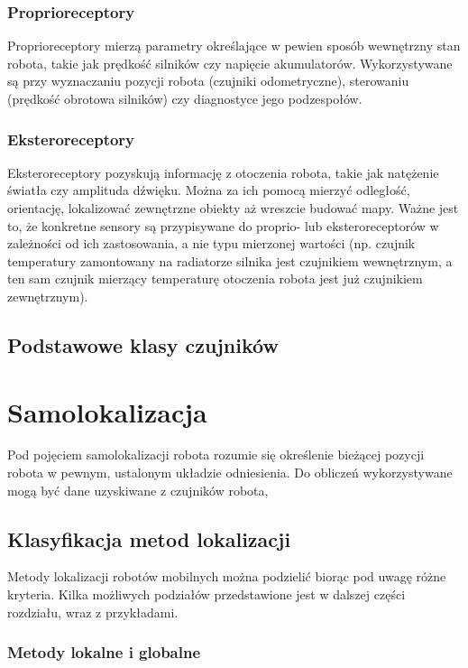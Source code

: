 \subsubsection{Proprioreceptory}

Proprioreceptory mierzą parametry określające w pewien sposób wewnętrzny stan
robota, takie jak prędkość silników czy napięcie akumulatorów. Wykorzystywane są
przy wyznaczaniu pozycji robota (czujniki odometryczne), sterowaniu (prędkość
obrotowa silników) czy diagnostyce jego podzespołów.

\subsubsection{Eksteroreceptory}

Eksteroreceptory pozyskują informację z otoczenia robota, takie jak natężenie
światła czy amplituda dźwięku. Można za ich pomocą mierzyć odległość,
orientację, lokalizować zewnętrzne obiekty aż wreszcie budować mapy.
Ważne jest to, że konkretne sensory są przypisywane do proprio- lub
eksteroreceptorów w zależności od ich zastosowania, a nie typu mierzonej
wartości (np. czujnik temperatury zamontowany na radiatorze silnika jest
czujnikiem wewnętrznym, a ten sam czujnik mierzący temperaturę otoczenia robota
jest już czujnikiem zewnętrznym).

\subsection{Podstawowe klasy czujników}

\section{Samolokalizacja}

Pod pojęciem samolokalizacji robota rozumie się określenie bieżącej pozycji
robota w pewnym, ustalonym układzie odniesienia. Do obliczeń wykorzystywane mogą
być dane uzyskiwane z czujników robota, 

\subsection{Klasyfikacja metod lokalizacji}

Metody lokalizacji robotów mobilnych można podzielić biorąc pod uwagę różne
kryteria. Kilka możliwych podziałów przedstawione jest w dalszej części
rozdziału, wraz z przykładami.

\subsubsection{Metody lokalne i globalne}

